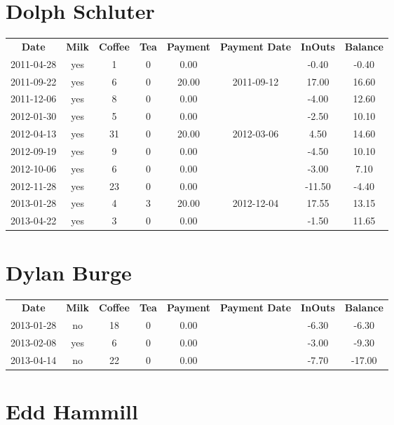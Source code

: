 \section{Dolph Schluter}

\begin{center}
\begin{tabular}{cccccccc}
\textbf{Date} & \textbf{Milk} & \textbf{Coffee} & \textbf{Tea} & \textbf{Payment} & \textbf{Payment Date} & \textbf{InOuts} & \textbf{Balance} \\
2011-04-28 & yes &  1 & 0 &  0.00 &  &  -0.40 & -0.40\\ 
2011-09-22 & yes &  6 & 0 & 20.00 & 2011-09-12 &  17.00 & 16.60\\ 
2011-12-06 & yes &  8 & 0 &  0.00 &  &  -4.00 & 12.60\\ 
2012-01-30 & yes &  5 & 0 &  0.00 &  &  -2.50 & 10.10\\ 
2012-04-13 & yes & 31 & 0 & 20.00 & 2012-03-06 &   4.50 & 14.60\\ 
2012-09-19 & yes &  9 & 0 &  0.00 &  &  -4.50 & 10.10\\ 
2012-10-06 & yes &  6 & 0 &  0.00 &  &  -3.00 &  7.10\\ 
2012-11-28 & yes & 23 & 0 &  0.00 &  & -11.50 & -4.40\\ 
2013-01-28 & yes &  4 & 3 & 20.00 & 2012-12-04 &  17.55 & 13.15\\ 
2013-04-22 & yes &  3 & 0 &  0.00 &  &  -1.50 & 11.65
\end{tabular}
\end{center}

\section{Dylan Burge}

\begin{center}
\begin{tabular}{cccccccc}
\textbf{Date} & \textbf{Milk} & \textbf{Coffee} & \textbf{Tea} & \textbf{Payment} & \textbf{Payment Date} & \textbf{InOuts} & \textbf{Balance} \\
2013-01-28 & no & 18 & 0 & 0.00 &  & -6.30 &  -6.30\\ 
2013-02-08 & yes &  6 & 0 & 0.00 &  & -3.00 &  -9.30\\ 
2013-04-14 & no & 22 & 0 & 0.00 &  & -7.70 & -17.00
\end{tabular}
\end{center}

\section{Edd Hammill}

